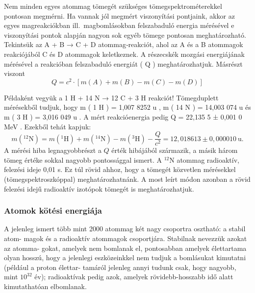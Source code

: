 \documentclass[../main.tex]{subfiles}
\begin{document}
Nem minden egyes atommag tömegét szükséges tömegspektrométerekkel pontosan megmérni. Ha vannak jól megmért viszonyítási pontjaink, akkor az egyes magreakciókban ill.\ magbomlásokban felszabaduló energia mérésével e viszonyítási pontok alapján nagyon sok egyéb tömege pontosan meghatározható. Tekintsük az A + B → C + D atommag‑reakciót, ahol az A és a B atommagok reakciójából C és D atommagok keletkeznek. A részecskék mozgási energiájának mérésével a reakcióban felszabaduló energiát ( Q ) meghatározhatjuk. Másrészt viszont
\begin{equation*}
Q = c^2 \cdot \left[ m ( A ) + m ( B ) - m ( C ) - m ( D ) \right]
\end{equation*}

Példaként vegyük a 1 H + 14 N → 12 C + 3 H reakciót! Tömegduplett mérésekből tudjuk, hogy m ( 1 H ) = 1,007 8252   u ,   m ( 14 N ) = 14,003 074   u és m ( 3 H ) = 3,016 049   u . A mért reakcióenergia pedig Q = 22,135 5 ± 0,001 0   MeV . Ezekből tehát kapjuk:
\begin{equation}
    m(^{12}\mathrm{N}) = m(^{1}\mathrm{H}) + m(^{14}\mathrm{N}) - m(^{3}\mathrm{H}) - \frac{Q}{c^2} = 12{,}018613 \pm 0{,}000010\ \mathrm{u}.    
\end{equation}
A mérési hiba legnagyobbrészt a $Q$ érték hibájából származik, a másik három tömeg
értéke sokkal nagyobb pontossággal ismert. A $^{12}\mathrm{N}$ atommag radioaktív, felezési ideje
0,01 s. Ez túl rövid ahhoz, hogy a tömegét közvetlen mérésekkel (tömegspektroszkóppal) meghatározhatnánk. A most leírt módon azonban a rövid felezési idejű radioaktív
izotópok tömegét is meghatározhatjuk.

\subsubsection{Atomok kötési energiája}
A jelenleg ismert több mint 2000 atommag két nagy csoportra osztható: a stabil atom-
magok és a radioaktív atommagok csoportjára. Stabilnak nevezzük azokat az atomma-
gokat, amelyek nem bomlanak el, pontosabban amelyek élettartama olyan hosszú, hogy
a jelenlegi eszközeinkkel nem tudjuk a bomlásukat kimutatni (például a proton élettar-
tamáról jelenleg annyi tudunk csak, hogy nagyobb, mint $10^{32}$ év); radioaktívak pedig
azok, amelyek rövidebb-hosszabb idő alatt kimutathatóan elbomlanak.
\end{document}

